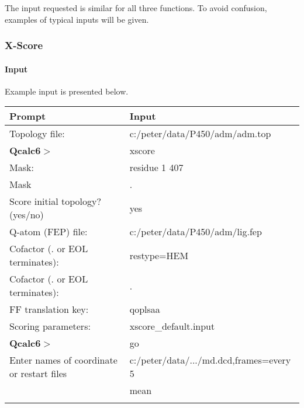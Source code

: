 \documentclass[a4paper,11pt]{article}
\begin{document}
The  input requested  is similar  for  all three  functions. To  avoid
confusion, examples of typical inputs will be given.

\subsubsection{X-Score}

\paragraph{Input}
  Example input is presented below.

  \begin{minipage}[t]{1.0\textwidth}
    \centering
    \begin{tabular}{ll}
      Prompt                        & Input     \\
      \hline
      Topology file:                & c:/peter/data/P450/adm/adm.top  \\
      \textbf{Qcalc6}$>$                        & xscore    \\
      Mask:                         & residue 1 407       \\
      Mask                          & .         \\


      Score initial topology? (yes/no) & yes                                  \\
      Q-atom (FEP) file:               & c:/peter/data/P450/adm/lig.fep  \\
      Cofactor (. or EOL terminates):  & restype=HEM                          \\
      Cofactor (. or EOL terminates):  & .                          \\
      FF translation key:              & qoplsaa                               \\
      Scoring parameters:              & xscore\_default.input                \\
      \textbf{Qcalc6}$>$                         & go                                   \\
      Enter names of coordinate or restart files & c:/peter/data/.../md.dcd,frames=every 5                                \\
                                   &  mean                                \\
      \hline
        & \\
    \end{tabular}
    \label{xinput}
  \end{minipage}
\end{document}

